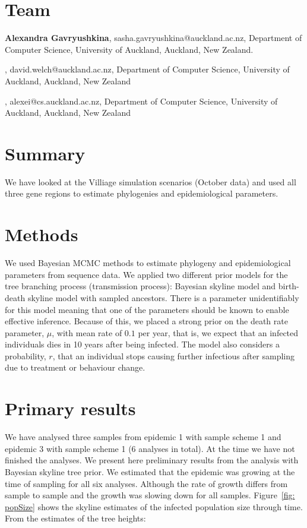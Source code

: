 \documentclass[12pt]{article}
\begin{document}
\section{Team}

{\bf Alexandra Gavryushkina}, sasha.gavryushkina@auckland.ac.nz, Department of Computer Science, University of Auckland, Auckland, New Zealand. 

\vskip2mm

, david.welch@auckland.ac.nz, Department of Computer Science, University of Auckland, Auckland, New Zealand

\vskip2mm

, alexei@cs.auckland.ac.nz, Department of Computer Science, University of Auckland, Auckland, New Zealand


\section{Summary}

We have looked at the Villiage simulation scenarios (October data) and used all three gene regions to estimate phylogenies and epidemiological parameters.

\section{Methods}

We used Bayesian MCMC methods to estimate phylogeny and epidemiological parameters from sequence data. We applied two different prior models for the tree branching process (transmission process): Bayesian skyline model and birth-death skyline model with sampled ancestors. There is a parameter unidentifiably for this model meaning that one of the parameters should be known to enable effective inference. Because of this, we placed a strong prior on the death rate parameter, $\mu$, with mean rate of $0.1$ per year, that is, we expect that an infected individuals dies in 10 years after being infected. The model also considers a probability, $r$, that an individual stops causing further infectious after sampling due to treatment or behaviour change. 

\section{Primary results}

We have analysed three samples from epidemic 1 with sample scheme 1 and epidemic 3 with sample scheme 1 (6 analyses in total). At the time we have not finished the analyses. We present here preliminary results from the analysis with Bayesian skyline tree prior. We estimated that the epidemic was growing at the time of sampling for all six analyses. Although the rate of growth differs from sample to sample and the growth was slowing down for all samples. Figure~\ref{fig: popSize} shows the skyline estimates of the infected population size through time.  From the estimates of the tree heights:
\end{document}
